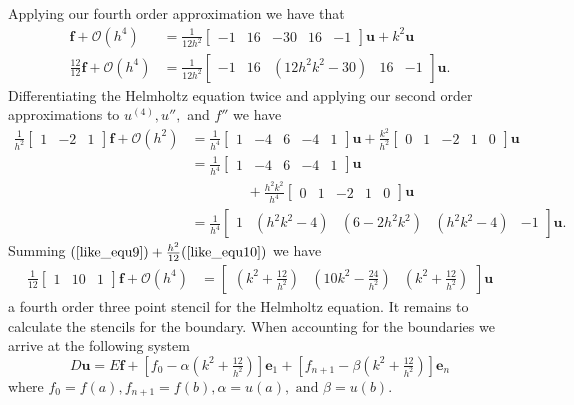 \documentclass[12pt]{article}
\newcommand{\bigO}{\mathcal{O}}
\renewcommand{\vec}[1]{\boldsymbol{\mathbf{#1}}}
\begin{document}
Applying our fourth order approximation we have that
\begin{align}
	\vec{f} + \bigO(h^4) &= \frac{1}{12h^2}\begin{bmatrix} -1 & 16 & -30 & 16 & -1 \end{bmatrix}\vec{u} + k^2 \vec{u} \nonumber \\
	\frac{12}{12}\vec{f} + \bigO(h^4)&= \frac{1}{12h^2}\begin{bmatrix} -1 & 16 & (12h^2k^2-30) & 16 & -1 \end{bmatrix}\vec{u}\text{.} \label{like_equ9}
\end{align}
Differentiating the Helmholtz equation twice and applying our second order approximations to $u^{(4)}, u'',$ and $f''$ we have
\begin{align}
 \frac{1}{h^2}\begin{bmatrix} 1 & -2 & 1 \end{bmatrix}\vec{f} + \bigO(h^2) &= \frac{1}{h^4}\begin{bmatrix} 1 & -4 & 6 & -4 & 1 \end{bmatrix}\vec{u} +  \frac{k^2}{h^2}\begin{bmatrix} 0 & 1 & -2 & 1 & 0 \end{bmatrix}\vec{u} \nonumber \\
&= \frac{1}{h^4}\begin{bmatrix} 1 & -4 & 6 & -4 & 1 \end{bmatrix}\vec{u} \nonumber \\
	& \phantom{===} +   \frac{h^2k^2}{h^4}\begin{bmatrix} 0 & 1 & -2 & 1 & 0 \end{bmatrix}\vec{u} \nonumber \\
&= \frac{1}{h^4}\begin{bmatrix} 1 & (h^2k^2-4) & (6-2h^2k^2) & (h^2k^2-4) & -1 \end{bmatrix}\vec{u}\text{.} \label{like_equ10}
\end{align}
Summing $(\ref{like_equ9}) + \frac{h^2}{12} (\ref{like_equ10})$ we have
\begin{align*}
	\frac{1}{12}\begin{bmatrix} 1 & 10 & 1 \end{bmatrix}\vec{f} + \bigO(h^4) &= \begin{bmatrix} (k^2+\frac{12}{h^2}) & (10k^2-\frac{24}{h^2}) & (k^2+\frac{12}{h^2})\end{bmatrix}\vec{u}
\end{align*}
a fourth order three point stencil for the Helmholtz equation. It remains to calculate the stencils for the boundary. When accounting for the boundaries we arrive at the following system
$$
D\vec{u} = E\vec{f} + \left[f_0 - \alpha(k^2+\tfrac{12}{h^2}) \right] \vec{e}_1 + \left[f_{n+1} - \beta(k^2+\tfrac{12}{h^2}) \right] \vec{e}_{n}
$$
where $f_0=f(a), f_{n+1}=f(b), \alpha = u(a), \text{ and }\beta=u(b)$. 
\end{document}
